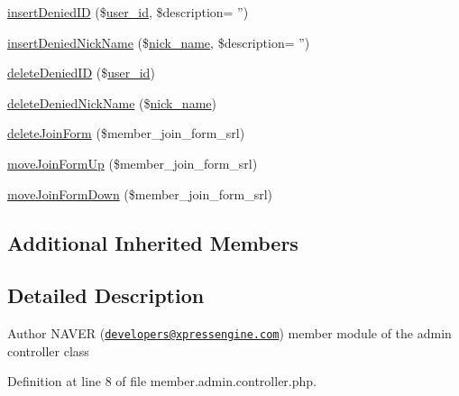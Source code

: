 \begin{DoxyCompactItemize}
\item 
\hyperlink{classmemberAdminController_ac60bb370f5cac395c99b05723ece5ccb}{insert\+Denied\+I\+D} (\$\hyperlink{ko_8install_8php_a74f1a394389d774e5b4cd5d1d15413f7}{user\+\_\+id}, \$description= '')
\item 
\hyperlink{classmemberAdminController_af3b39a52edd371b5dd5071987f25ed64}{insert\+Denied\+Nick\+Name} (\$\hyperlink{ko_8install_8php_a151ecae87a1f3d7e257aa089803086bd}{nick\+\_\+name}, \$description= '')
\item 
\hyperlink{classmemberAdminController_af7f02615adb1cbd7b8b91a330bda1a38}{delete\+Denied\+I\+D} (\$\hyperlink{ko_8install_8php_a74f1a394389d774e5b4cd5d1d15413f7}{user\+\_\+id})
\item 
\hyperlink{classmemberAdminController_a20792ed4ccef3abf09eb3fbd5dd955fb}{delete\+Denied\+Nick\+Name} (\$\hyperlink{ko_8install_8php_a151ecae87a1f3d7e257aa089803086bd}{nick\+\_\+name})
\item 
\hyperlink{classmemberAdminController_a3fbfbbc1a77c7aaaed901e08fd2ec09c}{delete\+Join\+Form} (\$member\+\_\+join\+\_\+form\+\_\+srl)
\item 
\hyperlink{classmemberAdminController_a6ab62c7dab973a7dc4d12b7739d82660}{move\+Join\+Form\+Up} (\$member\+\_\+join\+\_\+form\+\_\+srl)
\item 
\hyperlink{classmemberAdminController_a07d6306d7ed6eadca11fdc8ca9eb10d4}{move\+Join\+Form\+Down} (\$member\+\_\+join\+\_\+form\+\_\+srl)
\end{DoxyCompactItemize}
\subsection*{Additional Inherited Members}


\subsection{Detailed Description}
\begin{DoxyAuthor}{Author}
N\+A\+V\+E\+R (\href{mailto:developers@xpressengine.com}{\tt developers@xpressengine.\+com}) member module of the admin controller class 
\end{DoxyAuthor}


Definition at line 8 of file member.\+admin.\+controller.\+php.



